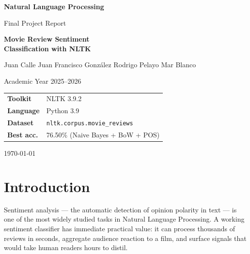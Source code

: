 \documentclass[11pt,a4paper]{article}
\begin{document}
\begin{titlepage}
  \centering
  \vspace*{2cm}

  {\Large\bfseries Natural Language Processing\par}
  \vspace{0.5cm}
  {\large Final Project Report\par}
  \vspace{2cm}

  {\Huge\bfseries Movie Review Sentiment\\[0.4em]Classification with NLTK\par}
  \vspace{2cm}

  {\large Juan Calle \quad Juan Francisco Gonz\'alez \quad Rodrigo Pelayo \quad Mar Blanco\par}
  \vspace{0.5cm}
  {\normalsize Academic Year 2025--2026\par}

  \vfill

  \begin{tabular}{ll}
    \textbf{Toolkit}   & NLTK 3.9.2 \\
    \textbf{Language}  & Python 3.9 \\
    \textbf{Dataset}   & \texttt{nltk.corpus.movie\_reviews} \\
    \textbf{Best acc.} & 76.50\% (Naive Bayes + BoW + POS) \\
  \end{tabular}

  \vspace{2cm}
  \today
\end{titlepage}

\tableofcontents
\newpage

\section{Introduction}

Sentiment analysis --- the automatic detection of opinion polarity in text --- is one of
the most widely studied tasks in Natural Language Processing. A working sentiment
classifier has immediate practical value: it can process thousands of reviews in seconds,
aggregate audience reaction to a film, and surface signals that would take human readers
hours to distil.
\end{document}
